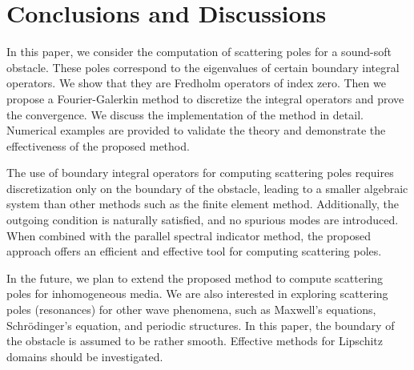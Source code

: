 \documentclass{article}
\begin{document}
	
	\section{Conclusions and Discussions}
	In this paper, we consider the computation of scattering poles for a sound-soft obstacle. These poles correspond to the eigenvalues of certain boundary integral operators. We show that they are Fredholm operators of index zero. Then we propose a Fourier-Galerkin method to discretize the integral operators and prove the convergence. We discuss the implementation of the method in detail. Numerical examples are provided to validate the theory and demonstrate the effectiveness of the proposed method.
	
	The use of boundary integral operators for computing scattering poles requires discretization only on the boundary of the obstacle, leading to a smaller algebraic system than other methods such as the finite element method. Additionally, the outgoing condition is naturally satisfied, and no spurious modes are introduced. When combined with the parallel spectral indicator method, the proposed approach offers an efficient and effective tool for computing scattering poles.
	
	In the future, we plan to extend the proposed method to compute scattering poles for inhomogeneous media. We are also interested in exploring scattering poles (resonances) for other wave phenomena, such as Maxwell's equations, Schr\"{o}dinger's equation, and periodic structures. In this paper, the boundary of the obstacle is assumed to be rather smooth. Effective methods for Lipschitz domains should be investigated.
	
\end{document}
